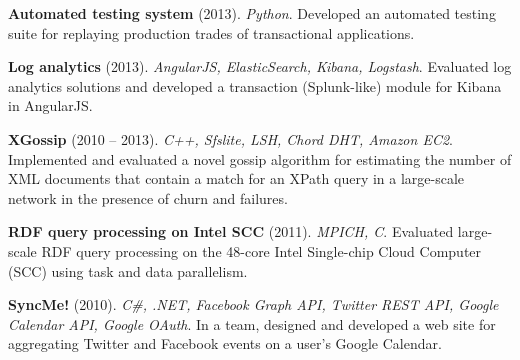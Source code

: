 \documentclass[margin,line]{resume}
\begin{document}
\begin{resume}
    \vspace{-2mm}
    \textbf{Automated testing system} (2013). \textsl{Python}. Developed an automated testing suite for replaying production trades of transactional applications.
    
   \vspace{-2mm}
    \textbf{Log analytics} (2013). \textsl{AngularJS, ElasticSearch, Kibana, Logstash}. Evaluated log analytics solutions and developed a transaction (Splunk-like) module for Kibana in AngularJS.

    \vspace{-2mm}    
    \textbf{XGossip} (2010 -- 2013). \textsl{C++, Sfslite, LSH, Chord DHT, Amazon EC2}. Implemented and evaluated a novel gossip algorithm for estimating the number of XML documents that contain a match for an XPath query in a large-scale network in the presence of churn and failures.

\vspace{-2mm}
    \textbf{RDF query processing on Intel SCC} (2011). \textsl{MPICH, C}. Evaluated large-scale RDF query processing on the 48-core Intel Single-chip Cloud Computer (SCC) using task and data parallelism.
    
\vspace{-2mm}
    \textbf{SyncMe!} (2010). \textsl{C\#, .NET, Facebook Graph API, Twitter REST API, Google Calendar API, Google OAuth}. In a team, designed and developed a web site for aggregating Twitter and Facebook events on a user's Google Calendar.




    


\end{resume}
\end{document}
